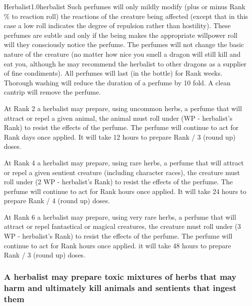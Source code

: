 \begin{skill}{Herbalist}{1.0}{herbalist}
Such perfumes will only mildly modify (plus or minus Rank \% to
reaction roll) the reactions of the creature being affected (except
that in this case a low roll indicates the degree of repulsion rather
than hostility). These perfumes are subtle and only if the being makes
the appropriate willpower roll will they consciously notice the
perfume. The perfumes will not change the basic nature of the creature
(\ie no matter how nice you smell a dragon will still kill and eat you,
although he may recommend the herbalist to other dragons as a supplier
of fine condiments).  All perfumes will last (in the bottle) for Rank
weeks. Thorough washing will reduce the duration of a perfume by 10
fold. A clean cantrip will remove the perfume.

\begin{Enumerate}

\item At Rank 2 a herbalist may prepare, using uncommon herbs, a
perfume that will attract or repel a given animal, the animal must
roll under (WP - herbalist's Rank) to resist the effects of the
perfume.  The perfume will continue to act for Rank days once applied.
It will take 12 hours to prepare Rank / 3 (round up) doses.

\item At Rank 4 a herbalist may prepare, using rare herbs, a perfume
that will attract or repel a given sentient creature (including
character races), the creature must roll under (2 \x WP - herbalist's
Rank) to resist the effects of the perfume.  The perfume will continue
to act for Rank  hours once applied.  It will take 24 hours to
prepare Rank / 4 (round up) doses.

\item At Rank 6 a herbalist may prepare, using very rare herbs, a
perfume that will attract or repel fantastical or magical creatures,
the creature must roll under (3 \x WP - herbalist's Rank) to resist
the effects of the perfume.  The perfume will continue to act for Rank
hours once applied.  it will take 48 hours to prepare Rank / 3 (round
up) doses.

\end{Enumerate}

\subsubsection{A herbalist may prepare toxic mixtures of herbs that may
harm and ultimately kill animals and sentients that ingest them}


\end{skill}
